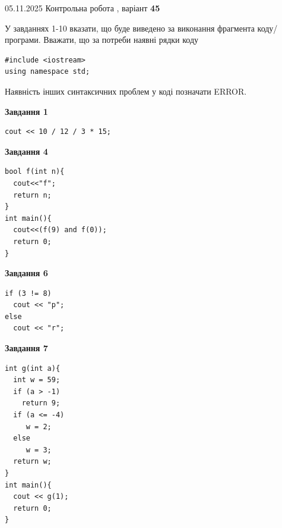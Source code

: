 \documentclass[12pt, ukrainian]{article}
\begin{document}
\newpage

{\Large{05.11.2025 Контрольна робота , варіант  \No \textbf { 45 }\par}}
{
\begin {large}
У завданнях 1-10 вказати, що буде виведено за виконання фрагмента коду/про\-гра\-ми.
Вважати, що за потреби наявні рядки коду
\begin{verbatim}
#include <iostream>
using namespace std;
\end{verbatim}
Наявність інших синтаксичних проблем у коді позначати ERROR.

\begin{minipage}[t]{7.0cm}

\begin{center}
\textbf{Завдання 1}
\end{center}
\vspace{-8mm}

\begin{verbatim}
cout << 10 / 12 / 3 * 15;
\end{verbatim}



\begin{center}
\textbf{Завдання 4}
\end{center}
\vspace{-8mm}

\begin{verbatim}
bool f(int n){
  cout<<"f";
  return n;
}
int main(){
  cout<<(f(9) and f(0));
  return 0;
}
\end{verbatim}



\begin{center}
\textbf{Завдання 6}
\end{center}
\vspace{-8mm}

\begin{verbatim}
if (3 != 8)
  cout << "p";
else
  cout << "r";
\end{verbatim}



\begin{center}
\textbf{Завдання 7}
\end{center}
\vspace{-8mm}

\begin{verbatim}
int g(int a){
  int w = 59;
  if (a > -1)
    return 9;
  if (a <= -4)
     w = 2;
  else
     w = 3;
  return w;
}
int main(){
  cout << g(1);
  return 0;
}
\end{verbatim}


\end{minipage}
\end{large}}
\end{document}
